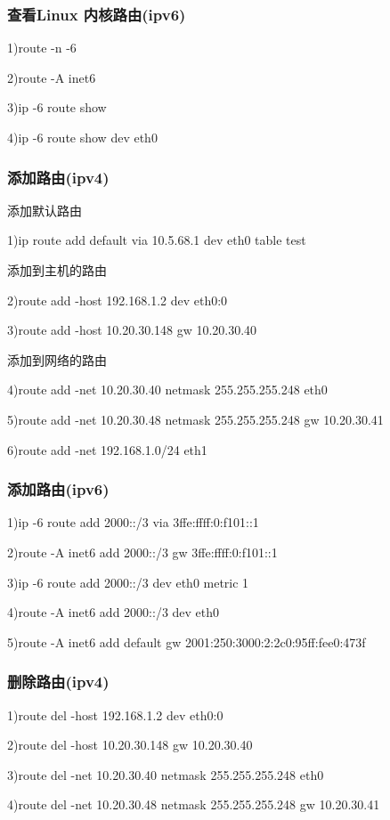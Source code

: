 \documentclass[letterpaper,10pt]{sphinxmanual}
\begin{document}
\subsubsection{查看Linux 内核路由(ipv6)}
\label{Linux_net/route:linux-ipv6}
1)route -n -6

2)route -A inet6

3)ip -6 route show

4)ip -6 route show dev eth0


\subsubsection{添加路由(ipv4)}
\label{Linux_net/route:ipv4}
添加默认路由

1)ip route add default via 10.5.68.1 dev eth0 table test

添加到主机的路由

2)route add -host 192.168.1.2 dev eth0:0

3)route add -host 10.20.30.148 gw 10.20.30.40

添加到网络的路由

4)route add -net 10.20.30.40 netmask 255.255.255.248 eth0

5)route add -net 10.20.30.48 netmask 255.255.255.248 gw 10.20.30.41

6)route add -net 192.168.1.0/24 eth1


\subsubsection{添加路由(ipv6)}
\label{Linux_net/route:ipv6}
1)ip -6 route add 2000::/3 via 3ffe:ffff:0:f101::1

2)route -A inet6 add 2000::/3 gw 3ffe:ffff:0:f101::1

3)ip -6 route add 2000::/3 dev eth0 metric 1

4)route -A inet6 add 2000::/3 dev eth0

5)route -A inet6 add default gw 2001:250:3000:2:2c0:95ff:fee0:473f


\subsubsection{删除路由(ipv4)}
\label{Linux_net/route:id2}
1)route del -host 192.168.1.2 dev eth0:0

2)route del -host 10.20.30.148 gw 10.20.30.40

3)route del -net 10.20.30.40 netmask 255.255.255.248 eth0

4)route del -net 10.20.30.48 netmask 255.255.255.248 gw 10.20.30.41
\end{document}
